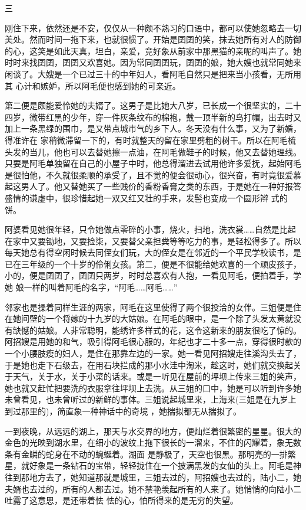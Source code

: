 \documentclass{article}
\begin{document}
三 

刚住下来，依然还是不安，仅仅从一种颇不熟习的口语中，都可以使她忽略去一切美处。然而时间一拖下来，也就很惯了。开始是囝囝的笑，抹去她所有对人的防御的心，这笑是如此天真，坦白，亲爱，竞好象从前家中那黑猫的亲呢的叫声了。她时时来找囝囝，囝囝又欢喜她。因为常同囝囝玩，囝囝的娘，她大嫂也就常同她来闲谈了。大嫂是一个已过三十的中年妇人，看阿毛自然只是把来当小孩看，无所用其
心计和嫉妒，所以阿毛便也感到她的可亲近。 

第二便是颇能爱怜她的夫婿了。这男子是比她大八岁，已长成一个很坚实的，二十四岁，微带红黑的少年，穿一件灰条纹布的棉袍，戴一顶半新的鸟打帽，出去时又加上一条黑绿的围巾，是又带点城市气的乡下人。冬天没有什么事，又为了新婚，得准许在
\newpage
家稍微滞留一下的，有时就整天的留在家里劈粗的树干。所以在阿毛梳头发的当儿，他也可以去替她擦一点油，在阿毛做鞋子的时候，他又去替她理线。只要是阿毛单独留在自己的小屋子中时，他总得溜进去试用他许多爱抚，起始阿毛是很怕他，不久就很柔顺的承受了，且不觉的便会很动心，很兴奋，有时竟很爱慕起这男人了。他又替她买了一些贱价的香粉香膏之类的东西，于是她在一种好报答盛情的谦虚中，很珍惜起她一双又红又壮的手来，发髻也变成一个圆形辫
式的饼。 

阿婆看见她很年轻，只令她做点零碎的小事，烧火，扫地，洗衣裳……自然是比起在家中又要锄地，又要捡柒，又要替父亲担粪等等吃力的事，是轻松得多了。所以每天她总有得空闲时候去同侄女们玩，大的侄女是在邻近的一个平民学校读书，是已在三年级的一个十岁的伶俐女孩。第二，便是不很能给她欢喜的一个顽皮孩子，小的，便是囝囝了，囝囝只两岁，时时总喜欢有人抱，一看见阿毛，便拍着手，学她
娘一样的叫着阿毛的名字，“阿毛……阿毛……” 

\newpage

邻家也是操着同样生涯的两家，阿毛在这里使得了两个很投洽的女伴。三姐便是住在她间壁的一个将嫁的十九岁的大姑娘。在阿毛的眼中，是一个除了头发太黄就没有缺憾的姑娘。人非常聪明，能绣许多样式的花，这令这新来的朋友很吃了惊的。阿招嫂是用她的和气，吸引得阿毛很心服的，年纪也才二十多一点，穿得很时款的一个小腰肢瘦的妇人，是住在那靠左边的一家。她一看见阿招嫂走往溪沟头去了，于是她也走下石级去，在用石块拦成的那小水洼中淘米，趁这时，她们就交换起关于天气，关于水，关于小菜的话来。或是一听见在屋前的坪坝上传来三姐的笑声，她也就又赶忙把要洗的衣服拿往坪坝上去洗。从三姐的口中，她是可以听到许多她未曾看见，也未曾听过的新鲜的事体。三姐说起城里来，上海来(三姐是在九岁上到过那里的)，简直象一种神话中的奇境
，她揣拟都无从揣拟了。 

一到夜晚，从远远的湖上，那天与水交界的地方，便灿烂着很繁密的星星。很大的金色的光映到湖水里，在细小的波纹上拖下很长的一溜来，不住的闪耀着，象无数条有金鳞的蛇身在不动的蜿蜒着。湖面
\newpage
是静极了，天空也很黑。那明亮的一排繁星，就好象是一条钻石的宝带，轻轻拢住在一个披满黑发的女仙的头上。阿毛是神往到那地方去了，她知道那就是城里，三姐去过的，阿招嫂也去过的，陆小二，她夫婿也去过的，所有的人都去过。她不禁艳羡起所有的人来了。她悄悄的向陆小二吐露了这意思，是还带着怯
怯的心，怕所得来的是无穷的失望。 
\end{document}
